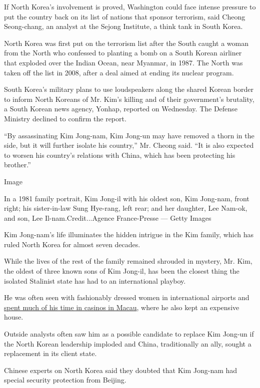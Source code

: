 If North Korea's involvement is proved, Washington could face intense
pressure to put the country back on its list of nations that sponsor
terrorism, said Cheong Seong-chang, an analyst at the Sejong Institute,
a think tank in South Korea.

North Korea was first put on the terrorism list after the South caught a
woman from the North who confessed to planting a bomb on a South Korean
airliner that exploded over the Indian Ocean, near Myanmar, in 1987. The
North was taken off the list in 2008, after a deal aimed at ending its
nuclear program.

South Korea's military plans to use loudspeakers along the shared Korean
border to inform North Koreans of Mr. Kim's killing and of their
government's brutality, a South Korean news agency, Yonhap, reported on
Wednesday. The Defense Ministry declined to confirm the report.

``By assassinating Kim Jong-nam, Kim Jong-un may have removed a thorn in
the side, but it will further isolate his country,'' Mr. Cheong said.
``It is also expected to worsen his country's relations with China,
which has been protecting his brother.''

Image

In a 1981 family portrait, Kim Jong-il with his oldest son, Kim
Jong-nam, front right; his sister-in-law Sung Hye-rang, left rear; and
her daughter, Lee Nam-ok, and son, Lee Il-nam.Credit...Agence
France-Presse --- Getty Images

Kim Jong-nam's life illuminates the hidden intrigue in the Kim family,
which has ruled North Korea for almost seven decades.

While the lives of the rest of the family remained shrouded in mystery,
Mr. Kim, the oldest of three known sons of Kim Jong-il, has been the
closest thing the isolated Stalinist state has had to an international
playboy.

He was often seen with fashionably dressed women in international
airports and
\href{https://mobile.nytimes3xbfgragh.onion/2007/02/01/world/asia/01iht-macao.4431509.html}{spent
much of his time in casinos in Macau}, where he also kept an expensive
house.

Outside analysts often saw him as a possible candidate to replace Kim
Jong-un if the North Korean leadership imploded and China, traditionally
an ally, sought a replacement in its client state.

Chinese experts on North Korea said they doubted that Kim Jong-nam had
special security protection from Beijing.

